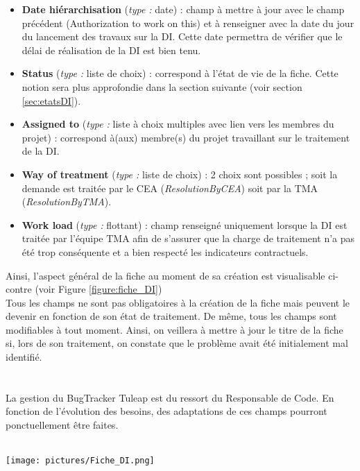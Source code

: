 \begin{itemize}[label=$\Rightarrow$, font=\LARGE]
   \item \textbf{Date hiérarchisation} (\textit{type :} date) : champ à mettre à jour avec le champ précédent (Authorization to work on this) et à renseigner avec la date du jour du lancement des travaux sur la DI. Cette date permettra de vérifier que le délai de réalisation de la DI est bien tenu.
   \item \textbf{Status} (\textit{type :} liste de choix) : correspond à l'état de vie de la fiche. Cette notion sera plus approfondie dans la section suivante (voir section \ref{sec:etatsDI}). 
   \item \textbf{Assigned to} (\textit{type :} liste à choix multiples avec lien vers les membres du projet) : correspond à(aux) membre(s) du projet travaillant sur le traitement de la DI.
   \item \textbf{Way of treatment} (\textit{type :} liste de choix) : 2 choix sont possibles ; soit la demande est traitée par le CEA (\textit{ResolutionByCEA}) soit par la TMA (\textit{ResolutionByTMA}).
   \item \textbf{Work load} (\textit{type :} flottant) : champ renseigné uniquement lorsque la DI est traitée par l'équipe TMA afin de s'assurer que la charge de traitement n'a pas été trop conséquente et a bien respecté les indicateurs contractuels.
\end{itemize}

\begin{minipage}[c]{0.35\linewidth}

\vspace*{0.2cm}
Ainsi, l'aspect général de la fiche au moment de sa création est visualisable ci-contre (voir Figure \ref{figure:fiche_DI})
\\
Tous les champs ne sont pas obligatoires à la création de la fiche mais peuvent le devenir en fonction de son état de traitement. De même, tous les champs sont modifiables à tout moment. Ainsi, on veillera à mettre à jour le titre de la fiche si, lors de son traitement, on constate que le problème avait été initialement mal identifié.\\
\\
\\
La gestion du BugTracker Tuleap est du ressort du Responsable de Code. En fonction de l'évolution des besoins, des adaptations de ces champs pourront ponctuellement être faites.
\\
\\
\end{minipage} \hfill
\begin{minipage}[c]{0.6\linewidth}
   
   \texttt{[image: pictures/Fiche\_DI.png]}\vspace*{0.2cm}
\end{minipage}

